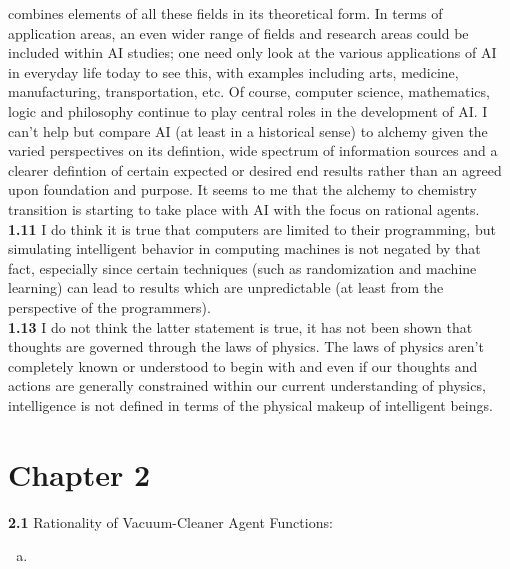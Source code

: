\documentclass{scrartcl}
\begin{document}
combines elements of all these fields in its theoretical form. In terms of application areas, an
even wider range of fields and research areas could be included within AI studies; one need only
look at the various applications of AI in everyday life today to see this, with examples including
arts, medicine, manufacturing, transportation, etc. Of course, computer science, mathematics, logic
and philosophy continue to play central roles in the development of AI. I can't help but compare AI
(at least in a historical sense) to alchemy given the varied perspectives on its defintion, wide
spectrum of information sources and a clearer defintion of certain expected or desired end results
rather than an agreed upon foundation and purpose. It seems to me that the alchemy to chemistry
transition is starting to take place with AI with the focus on rational agents.
\bigskip
\\
\textbf{1.11} I do think it is true that computers are limited to their programming, but simulating
intelligent behavior in computing machines is not negated by that fact, especially since certain
techniques (such as randomization and machine learning) can lead to results which are unpredictable
(at least from the perspective of the programmers).
\bigskip
\\
\textbf{1.13} I do not think the latter statement is true, it has not been shown that thoughts are
governed through the laws of physics. The laws of physics aren't completely known or understood to
begin with and even if our thoughts and actions are generally constrained within our current
understanding of physics, intelligence is not defined in terms of the physical makeup of intelligent
beings.
\section*{Chapter 2}
\textbf{2.1} Rationality of Vacuum-Cleaner Agent Functions:
\begin{enumerate}[(a)]
    \item
\end{enumerate}
\end{document}
